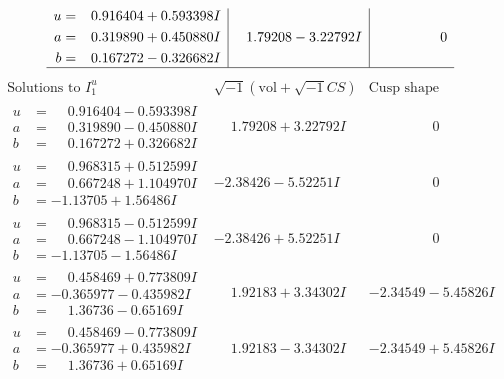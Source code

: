 \documentclass[1p]{elsarticle_modified}
\theoremstyle{definition}
\newcommand{\I}{\sqrt{-1}}
\begin{document}
$$\begin{array}{c|c|c}
\begin{aligned}
u &= \phantom{-}0.916404 + 0.593398 I \\
a &= \phantom{-}0.319890 + 0.450880 I \\
b &= \phantom{-}0.167272 - 0.326682 I\end{aligned}
 & \phantom{-}1.79208 - 3.22792 I & \phantom{-0.000000 } 0\\
 \hline 
 \end{array}$$\newpage$$\begin{array}{c|c|c}  
\text{Solutions to }I^u_{1}& \I (\text{vol} + \sqrt{-1}CS) & \text{Cusp shape}\\
 \hline 
\begin{aligned}
u &= \phantom{-}0.916404 - 0.593398 I \\
a &= \phantom{-}0.319890 - 0.450880 I \\
b &= \phantom{-}0.167272 + 0.326682 I\end{aligned}
 & \phantom{-}1.79208 + 3.22792 I & \phantom{-0.000000 } 0 \\ \hline\begin{aligned}
u &= \phantom{-}0.968315 + 0.512599 I \\
a &= \phantom{-}0.667248 + 1.104970 I \\
b &= -1.13705 + 1.56486 I\end{aligned}
 & -2.38426 - 5.52251 I & \phantom{-0.000000 } 0 \\ \hline\begin{aligned}
u &= \phantom{-}0.968315 - 0.512599 I \\
a &= \phantom{-}0.667248 - 1.104970 I \\
b &= -1.13705 - 1.56486 I\end{aligned}
 & -2.38426 + 5.52251 I & \phantom{-0.000000 } 0 \\ \hline\begin{aligned}
u &= \phantom{-}0.458469 + 0.773809 I \\
a &= -0.365977 - 0.435982 I \\
b &= \phantom{-}1.36736 - 0.65169 I\end{aligned}
 & \phantom{-}1.92183 + 3.34302 I & -2.34549 - 5.45826 I \\ \hline\begin{aligned}
u &= \phantom{-}0.458469 - 0.773809 I \\
a &= -0.365977 + 0.435982 I \\
b &= \phantom{-}1.36736 + 0.65169 I\end{aligned}
 & \phantom{-}1.92183 - 3.34302 I & -2.34549 + 5.45826 I \\ \hline\begin{aligned}

\end{aligned}
\end{array}$$
\end{document}
